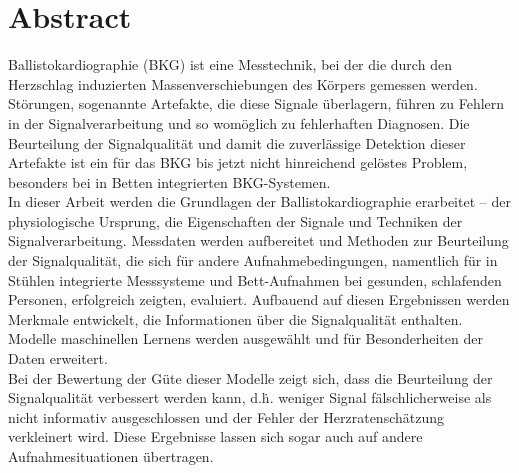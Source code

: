 \clearpage
\chapter*{Abstract}\label{abstract}


Ballistokardiographie (BKG) ist eine Messtechnik, bei der die durch den Herzschlag induzierten Massenverschiebungen des Körpers gemessen werden. Störungen, sogenannte Artefakte, die diese Signale überlagern, führen zu Fehlern in der Signalverarbeitung und so womöglich zu fehlerhaften Diagnosen. Die Beurteilung der Signalqualität und damit die zuverlässige Detektion dieser Artefakte ist ein für das BKG bis jetzt nicht hinreichend gelöstes Problem, besonders bei in Betten integrierten BKG-Systemen.\\ 
In dieser Arbeit werden die Grundlagen der Ballistokardiographie erarbeitet -- der physiologische Ursprung, die Eigenschaften der Signale und Techniken der Signalverarbeitung. Messdaten werden aufbereitet und Methoden zur Beurteilung der Signalqualität, die sich für andere Aufnahmebedingungen, namentlich für in Stühlen integrierte Messsysteme und Bett-Aufnahmen bei gesunden, schlafenden Personen, erfolgreich zeigten, evaluiert. Aufbauend auf diesen Ergebnissen werden Merkmale entwickelt, die Informationen über die Signalqualität enthalten. Modelle maschinellen Lernens werden ausgewählt und für Besonderheiten der Daten erweitert.\\
Bei der Bewertung der Güte dieser Modelle zeigt sich, dass die Beurteilung der Signalqualität verbessert werden kann, d.\.h. weniger Signal fälschlicherweise als nicht informativ ausgeschlossen und der Fehler der Herzratenschätzung verkleinert wird. Diese Ergebnisse lassen sich sogar auch auf andere Aufnahmesituationen übertragen.

